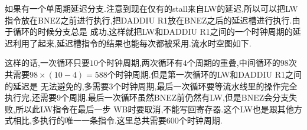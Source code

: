 \documentclass[adobefonts, nocap]{ctexart}
\begin{document}
    如果有一个单周期延迟分支.注意到现在仅有的stall来自LW的延迟,所以可以把LW指令放在BNEZ之前进行执行,把DADDIU R1放在BNEZ之后的延迟槽进行执行.由于循环的时候分支总是
    成功,这样就把LW和DADDIU R1之间的一个时钟周期的延迟利用了起来,延迟槽指令的结果也能每次都被采用.流水时空图如下.

    这样的话,一次循环只要$10$个时钟周期,两次循环有$4$个周期的重叠,中间循环的$98$次共需要$98\times (10-4)=588$个时钟周期.但是第一次循环的LW和DADDIU R1之间的延迟是
    无法避免的,多需要$3$个时钟周期,最后一次循环要等流水线里的操作完全执行完,还需要$9$个周期.最后一次循环虽然BNEZ前仍然有LW,但是BNEZ会分支失败,所以此LW指令在最后一步
    WB时要取消,不能写回寄存器.这个LW也是跟其他方式相比,多执行的唯一一条指令.这里总共需要$600$个时钟周期.

    {\footnotesize
    }
\end{document}
